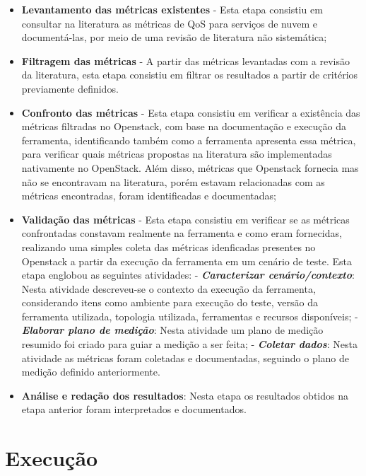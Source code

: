 \documentclass[conference]{IEEEtran}
\begin{document}
\begin{itemize}
 \item \textbf{Levantamento das métricas existentes} - Esta etapa consistiu em consultar na literatura as métricas de QoS para
	serviços de nuvem e documentá-las, por meio de uma revisão de literatura não sistemática;

 \item \textbf{Filtragem das métricas} - A partir das métricas levantadas com a revisão da literatura, esta etapa consistiu em 
	filtrar os resultados a partir de critérios previamente definidos.
	
 \item \textbf{Confronto das métricas} - Esta etapa consistiu em verificar a existência das métricas filtradas no Openstack,	
	com base na documentação e execução da ferramenta, identificando também como a ferramenta apresenta essa métrica,
	para verificar quais métricas propostas na literatura são implementadas nativamente no OpenStack. Além disso,
	métricas que Openstack fornecia mas não se encontravam na literatura, porém estavam relacionadas com as métricas encontradas,
	foram identificadas e documentadas;
 
 \item \textbf{Validação das métricas} - Esta etapa consistiu em verificar se as métricas confrontadas constavam realmente na ferramenta e
	como eram fornecidas,
	realizando uma simples coleta das métricas idenficadas presentes no Openstack a partir da execução da ferramenta em um cenário de teste.
	Esta etapa englobou as seguintes atividades:
	\subitem - \emph{\textbf{Caracterizar cenário/contexto}}: Nesta atividade descreveu-se o contexto da execução da ferramenta,
		 considerando itens como ambiente para execução do teste, versão da ferramenta utilizada, topologia utilizada, ferramentas
		 e recursos disponíveis;
	\subitem - \emph{\textbf{Elaborar plano de medição}}: Nesta atividade um plano de medição resumido foi criado para guiar a medição
		 a ser feita;
	\subitem - \emph{\textbf{Coletar dados}}: Nesta atividade as métricas foram coletadas e documentadas, seguindo o
		 plano de medição definido anteriormente.

 \item \textbf{Análise e redação dos resultados}: Nesta etapa os resultados obtidos na etapa anterior foram interpretados e documentados.
\end{itemize}

\section{Execução} %
\end{document}
